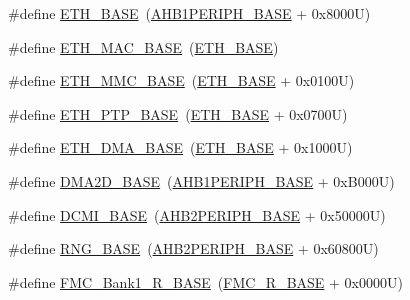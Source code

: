 \begin{DoxyCompactItemize}
\item 
\#define \hyperlink{group___peripheral__memory__map_gad965a7b1106ece575ed3da10c45c65cc}{E\+T\+H\+\_\+\+B\+A\+SE}~(\hyperlink{group___peripheral__memory__map_ga811a9a4ca17f0a50354a9169541d56c4}{A\+H\+B1\+P\+E\+R\+I\+P\+H\+\_\+\+B\+A\+SE} + 0x8000\+U)
\item 
\#define \hyperlink{group___peripheral__memory__map_ga3cf7005808feb61bff1fee01e50a711a}{E\+T\+H\+\_\+\+M\+A\+C\+\_\+\+B\+A\+SE}~(\hyperlink{group___peripheral__memory__map_gad965a7b1106ece575ed3da10c45c65cc}{E\+T\+H\+\_\+\+B\+A\+SE})
\item 
\#define \hyperlink{group___peripheral__memory__map_ga4946f2b3b03f7998343ac1778fbcf725}{E\+T\+H\+\_\+\+M\+M\+C\+\_\+\+B\+A\+SE}~(\hyperlink{group___peripheral__memory__map_gad965a7b1106ece575ed3da10c45c65cc}{E\+T\+H\+\_\+\+B\+A\+SE} + 0x0100\+U)
\item 
\#define \hyperlink{group___peripheral__memory__map_gaa0f60b922aeb7275c785cbaa8f94ecf0}{E\+T\+H\+\_\+\+P\+T\+P\+\_\+\+B\+A\+SE}~(\hyperlink{group___peripheral__memory__map_gad965a7b1106ece575ed3da10c45c65cc}{E\+T\+H\+\_\+\+B\+A\+SE} + 0x0700\+U)
\item 
\#define \hyperlink{group___peripheral__memory__map_gace2114e1b37c1ba88d60f3e831b67e93}{E\+T\+H\+\_\+\+D\+M\+A\+\_\+\+B\+A\+SE}~(\hyperlink{group___peripheral__memory__map_gad965a7b1106ece575ed3da10c45c65cc}{E\+T\+H\+\_\+\+B\+A\+SE} + 0x1000\+U)
\item 
\#define \hyperlink{group___peripheral__memory__map_gacec66385fd1604e69584eb19a0aaa303}{D\+M\+A2\+D\+\_\+\+B\+A\+SE}~(\hyperlink{group___peripheral__memory__map_ga811a9a4ca17f0a50354a9169541d56c4}{A\+H\+B1\+P\+E\+R\+I\+P\+H\+\_\+\+B\+A\+SE} + 0x\+B000\+U)
\item 
\#define \hyperlink{group___peripheral__memory__map_ga55b794507e021135486de57129a2505c}{D\+C\+M\+I\+\_\+\+B\+A\+SE}~(\hyperlink{group___peripheral__memory__map_gaeedaa71d22a1948492365e2cd26cfd46}{A\+H\+B2\+P\+E\+R\+I\+P\+H\+\_\+\+B\+A\+SE} + 0x50000\+U)
\item 
\#define \hyperlink{group___peripheral__memory__map_gab92662976cfe62457141e5b4f83d541c}{R\+N\+G\+\_\+\+B\+A\+SE}~(\hyperlink{group___peripheral__memory__map_gaeedaa71d22a1948492365e2cd26cfd46}{A\+H\+B2\+P\+E\+R\+I\+P\+H\+\_\+\+B\+A\+SE} + 0x60800\+U)
\item 
\#define \hyperlink{group___peripheral__memory__map_ga1d581e6f64ed2e5d97c11c58285a21b6}{F\+M\+C\+\_\+\+Bank1\+\_\+\+R\+\_\+\+B\+A\+SE}~(\hyperlink{group___peripheral__memory__map_ga7a599164cd92798542bc6288793d1ed5}{F\+M\+C\+\_\+\+R\+\_\+\+B\+A\+SE} + 0x0000\+U)

\end{DoxyCompactItemize}
